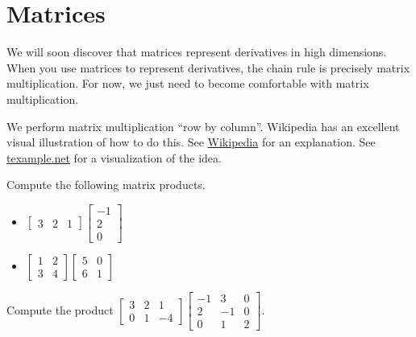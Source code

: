 \section{Matrices}\label{review matrices}
We will soon discover that matrices represent derivatives in high dimensions. When you use matrices to represent derivatives, the chain rule is precisely matrix multiplication. For now, we just need to become comfortable with matrix multiplication.

We perform matrix multiplication ``row by column''.  Wikipedia has an excellent visual illustration of how to do this. See 
\href{http://en.wikipedia.org/wiki/Matrix\_multiplication}{Wikipedia} for an explanation. See \href{http://www.texample.net/tikz/examples/matrix-multiplication/}{texample.net} for a visualization of the idea.

\begin{problem} 
Compute the following matrix products.
\begin{itemize}
\item $\begin{bmatrix}
3 & 2& 1
\end{bmatrix}
\begin{bmatrix}
-1 \\
 2\\
 0
\end{bmatrix}$
\item
$\begin{bmatrix}1 &2\\3&4\end{bmatrix}\begin{bmatrix}5&0\\6&1\end{bmatrix}$
\end{itemize} \end{problem}


\begin{problem} Compute the product
$\begin{bmatrix}
3 & 2& 1\\
0 & 1& -4
\end{bmatrix}
\begin{bmatrix}
-1&3 &0 \\
 2&-1 &0\\
 0&1 &2
\end{bmatrix}$.
\end{problem}


